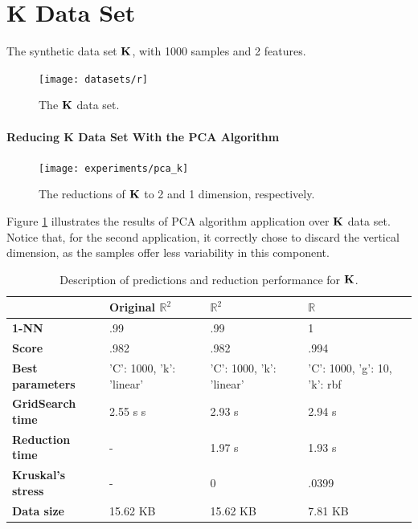 \section{K Data Set}

The synthetic data set $\mathbf{K}$, with 1000 samples and 2 features.
\newline\newline

\begin{figure}[H]
	\centering
	\captionsetup{justification=centering}
	\texttt{[image: datasets/r]}
	\caption{The $\mathbf{K}$ data set.}
\end{figure}

\newpage
\paragraph{Reducing K Data Set With the PCA Algorithm}

\begin{figure}[H]
	\centering
	\captionsetup{justification=centering}
	
	\texttt{[image: experiments/pca\_k]}
	\caption{The reductions of $\mathbf{K}$ to 2 and 1 dimension, respectively.}
	\label{fig:dsrpca}
\end{figure}

Figure \ref{fig:dsrpca} illustrates the results of PCA algorithm application over $\mathbf{K}$ data set. Notice that, for the second application, it correctly chose to discard the vertical dimension, as the samples offer less variability in this component.

\begin{table}[H]
	\centering
	\begin{tabular}{|p{.25\linewidth}|p{.20\linewidth}|p{.20\linewidth}|p{.20\linewidth}|}
		\hline
		& \textbf{Original $\mathbb{R}^2$} & \textbf{$\mathbb{R}^2$} & \textbf{$\mathbb{R}$} \\\hline
		\textbf{1-NN} & .99 & .99 & 1 \\\hline
		\textbf{Score} & .982 & .982 & .994 \\\hline
		\textbf{Best parameters} & 'C': 1000, 'k': 'linear' & 'C': 1000, 'k': 'linear' & 'C': 1000, 'g': 10, 'k': rbf \\\hline
		\textbf{GridSearch time} & 2.55 s s & 2.93 s & 2.94 s \\\hline
		\textbf{Reduction time} & - & 1.97 s & 1.93 s \\\hline
		\textbf{Kruskal's stress} & - & 0 & .0399 \\\hline
		\textbf{Data size} & 15.62 KB & 15.62 KB & 7.81 KB \\\hline
	\end{tabular}
	\captionsetup{justification=centering}
	\caption{Description of predictions and reduction performance for $\mathbf{K}$.}
\end{table}


